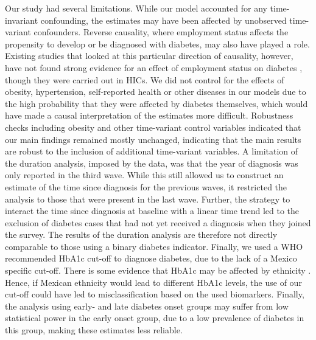 \documentclass[12pt,english]{article}
\begin{document}
Our study had several limitations. While our model accounted for any time-invariant confounding, the estimates may have been affected by unobserved time-variant confounders. Reverse causality, where employment status affects the propensity to develop or be diagnosed with diabetes, may also have played a role. Existing studies that looked at this particular direction of causality, however, have not found strong evidence for an effect of employment status on diabetes \parencite{Bergemann2011,Schaller2015}, though they were carried out in \acp{HIC}. We did not control for the effects of obesity, hypertension, self-reported health or other diseases in our models due to the high probability that they were affected by diabetes themselves, which would have made a causal interpretation of the estimates more difficult. Robustness checks including obesity and other time-variant control variables indicated that our main findings remained mostly unchanged, indicating that the main results are robust to the inclusion of additional time-variant variables.  A limitation of the duration analysis, imposed by the data, was that the year of diagnosis was only reported in the third wave. While this still allowed us to construct an estimate of the time since diagnosis for the previous waves, it restricted the analysis to those that were present in the last wave. Further, the strategy to interact the time since diagnosis at baseline with a linear time trend led to the exclusion of diabetes cases that had not yet received a diagnosis when they joined the survey. The results of the duration analysis are therefore not directly comparable to those using a binary diabetes indicator. Finally, we used a WHO recommended \ac{HbA1c} cut-off to diagnose diabetes, due to the lack of a Mexico specific cut-off. There is some evidence that \ac{HbA1c} may be affected by ethnicity \parencite{Sacks2011}. Hence, if Mexican ethnicity would lead to different \ac{HbA1c} levels, the use of our cut-off could have led to misclassification based on the used biomarkers. Finally, the analysis using early- and late diabetes onset groups may suffer from low statistical power in the early onset group, due to a low prevalence of diabetes in this group, making these estimates less reliable. 
\end{document}
